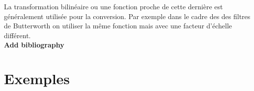 \documentclass[11pt,a4paper]{article}
\begin{document}
La transformation bilinéaire ou une fonction proche de cette dernière est généralement utilisée pour la conversion. Par exemple dans le cadre des des filtres de Butterworth on utiliser la même fonction mais avec une facteur d'échelle différent.\\

\textbf{Add bibliography \label{**BIBLIO!}}
 
\section{Exemples} 
\end{document}
